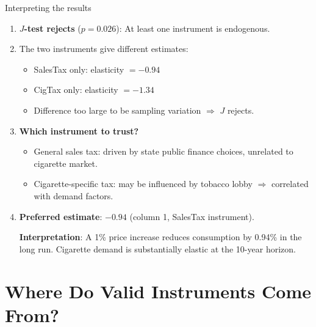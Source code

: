 \documentclass[10pt]{beamer}
\begin{document}
\begin{frame}{Interpreting the results}
\label{slide:cig_interpretation}
\begin{enumerate}
  \item \textbf{$J$-test rejects} ($p = 0.026$): At least one instrument is endogenous.

  \pause
  \item The two instruments give \alert{different estimates}:
  \begin{itemize}
    \item SalesTax only: elasticity $= -0.94$
    \item CigTax only: elasticity $= -1.34$
    \item Difference too large to be sampling variation $\Rightarrow$ $J$ rejects.
  \end{itemize}

  \pause
  \item \textbf{Which instrument to trust?}
  \begin{itemize}
    \item General sales tax: driven by state public finance choices, unrelated to cigarette market.
    \item Cigarette-specific tax: may be influenced by tobacco lobby $\Rightarrow$ correlated with demand factors.
  \end{itemize}

  \pause
  \item \textbf{Preferred estimate}: $-0.94$ (column 1, SalesTax instrument).

  \vspace{0.3em}
  \textbf{Interpretation}: A 1\% price increase reduces consumption by 0.94\% in the long run. Cigarette demand is substantially elastic at the 10-year horizon.
\end{enumerate}
\end{frame}

\section{Where Do Valid Instruments Come From?}
\end{document}
